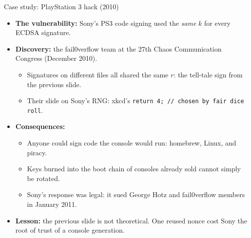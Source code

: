 \ifdefined\PRESENTATION\else\PassOptionsToClass{handout}{beamer}\fi\documentclass[aspectratio=169, lualatex]{beamer}
\begin{document}
\begin{frame}{Case study: PlayStation 3 hack (2010)}
	\begin{itemize}
		\item \textbf{The vulnerability:} Sony's PS3 code signing used the \emph{same} $k$ for every ECDSA signature.
		\item \textbf{Discovery:} the fail0verflow team at the 27th Chaos Communication Congress (December 2010).
		      \begin{itemize}
			      \item Signatures on different files all shared the same $r$: the tell-tale sign from the previous slide.
			      \item Their slide on Sony's RNG: xkcd's \texttt{return 4; // chosen by fair dice roll}.
		      \end{itemize}
		\item \textbf{Consequences:}
		      \begin{itemize}
			      \item Anyone could sign code the console would run: homebrew, Linux, and piracy.
			      \item Keys burned into the boot chain of consoles already sold cannot simply be rotated.
			      \item Sony's response was legal: it sued George Hotz and fail0verflow members in January 2011.
		      \end{itemize}
		\item \textbf{Lesson:} the previous slide is not theoretical. One reused nonce cost Sony the root of trust of a console generation.
	\end{itemize}
\end{frame}
\end{document}
